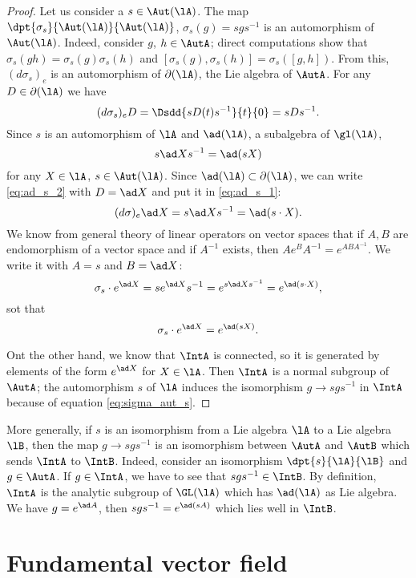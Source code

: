 \begin{proof}
Let us consider a $s\in\Aut(\lA)$. The map $\dpt{\sigma_s}{\Aut(\lA)}{\Aut(\lA)}$, $\sigma_s(g)=sgs^{-1}$ is an automorphism of $\Aut(\lA)$. Indeed, consider $g$, $h\in\AutA$; direct computations show that $\sigma_s(gh)=\sigma_s(g)\sigma_s(h)$ and $[\sigma_s(g),\sigma_s(h)]=\sigma_s([g,h])$. From this, $(d\sigma_s)_e$ is an automorphism of $\partial(\lA)$, the Lie algebra of $\AutA$. For any $D\in\partial(\lA)$ we have
\begin{equation}\label{eq:ad_s_2}
 (d\sigma_s)_eD=\Dsdd{ sD(t)s^{-1} }{t}{0}
             =sDs^{-1}.
\end{equation}
Since $s$ is an automorphism of $\lA$ and $\ad(\lA)$, a subalgebra of $\gl(\lA)$,
\begin{equation}\label{eq:ad_s_1}
  s\ad Xs^{-1}=\ad(sX)
\end{equation}
for any $X\in\lA$, $s\in\Aut(\lA)$. Since $\ad(\lA)\subset\partial(\lA)$, we can write \eqref{eq:ad_s_2} with $D=\ad X$ and put it in \eqref{eq:ad_s_1}:
\[
   (d\sigma)_e\ad X=s\ad Xs^{-1}=\ad(s\cdot X).
\]
We know from general theory of linear operators on vector spaces that if $A,B$ are endomorphism of a vector space and if $A^{-1}$ exists, then $Ae^BA^{-1}=e^{ABA^{-1}}$. We write it with $A=s$ and $B=\ad X$:
\[
  \sigma_s\cdot e^{\ad X}=se^{\ad X}s^{-1}=e^{s\ad Xs^{-1}}=e^{\ad(s\cdot X)},
\]
sot that
\begin{equation}\label{eq:sigma_aut_s}
  \sigma_s\cdot e^{\ad X}=e^{\ad(s X)}.
\end{equation}

Ont the other hand, we know that $\IntA$ is connected, so it is generated by elements of the form $e^{\ad X}$ for $X\in\lA$. Then $\IntA$ is a normal subgroup of $\AutA$; the automorphism $s$ of $\lA$ induces the isomorphism $g\to sgs^{-1}$ in $\IntA$ because of equation \eqref{eq:sigma_aut_s}.
\end{proof}

More generally, if $s$ is an isomorphism from a Lie algebra $\lA$ to a Lie algebra $\lB$, then the map $g\to sgs^{-1}$ is an isomorphism between $\AutA$ and $\AutB$ which sends $\IntA$ to $\IntB$. Indeed, consider an isomorphism $\dpt{s}{\lA}{\lB}$ and $g\in\AutA$. If $g\in\IntA$, we have to see that $sgs^{-1}\in\IntB$. By definition, $\IntA$ is the analytic subgroup of $\GL(\lA)$ which has $\ad(\lA)$ as Lie algebra. We have $g=e^{\ad A}$, then $sgs^{-1}=e^{\ad(sA)}$ which lies well in $\IntB$.

\section{Fundamental vector field}\label{sec:fond_vec}

